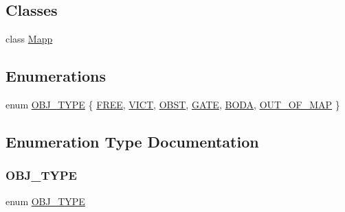 \subsection*{Classes}
\begin{DoxyCompactItemize}
\item 
class \mbox{\hyperlink{class_mapp}{Mapp}}
\end{DoxyCompactItemize}
\subsection*{Enumerations}
\begin{DoxyCompactItemize}
\item 
enum \mbox{\hyperlink{map_8hh_a714b9c2c276fbae637fee36453d9121e}{O\+B\+J\+\_\+\+T\+Y\+PE}} \{ \newline
\mbox{\hyperlink{map_8hh_a714b9c2c276fbae637fee36453d9121eacc62d1576546f3245237e1b232d838b6}{F\+R\+EE}}, 
\mbox{\hyperlink{map_8hh_a714b9c2c276fbae637fee36453d9121ea71a79ec3ed4c3f42f62a3d9998424be7}{V\+I\+CT}}, 
\mbox{\hyperlink{map_8hh_a714b9c2c276fbae637fee36453d9121ea9bfb772b98998217b3d7caf5a94b9938}{O\+B\+ST}}, 
\mbox{\hyperlink{map_8hh_a714b9c2c276fbae637fee36453d9121eac00a9212e2a45c125c4e3ca32bbfc0f8}{G\+A\+TE}}, 
\newline
\mbox{\hyperlink{map_8hh_a714b9c2c276fbae637fee36453d9121eae00209173a2bee1d1552d2e3b61b1a36}{B\+O\+DA}}, 
\mbox{\hyperlink{map_8hh_a714b9c2c276fbae637fee36453d9121ea37949ac95940e057a3daec22b384ddf8}{O\+U\+T\+\_\+\+O\+F\+\_\+\+M\+AP}}
 \}
\end{DoxyCompactItemize}


\subsection{Enumeration Type Documentation}
\mbox{\label{map_8hh_a714b9c2c276fbae637fee36453d9121e}} 
\subsubsection{\texorpdfstring{OBJ\_TYPE}{OBJ\_TYPE}}
{\footnotesize\ttfamily enum \mbox{\hyperlink{map_8hh_a714b9c2c276fbae637fee36453d9121e}{O\+B\+J\+\_\+\+T\+Y\+PE}}}

